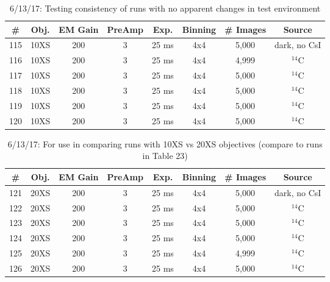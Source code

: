\documentclass[12pt]{amsart}
\begin{document}
\begin{table}[!htbp]
	\centering
	\caption{6/13/17: Testing consistency of runs with no apparent changes in test environment}
	\label{tab:table22}
	\hspace*{-1cm}
	\begin{tabular}{cccccccc}
	\toprule
	\# & Obj. & EM Gain & PreAmp & Exp. & Binning & \# Images & Source\\
	\midrule
	115 & 10XS & 200 & 3 & 25 ms & 4x4 & 5,000 & dark, no CsI\\
	116 & 10XS & 200 & 3 & 25 ms & 4x4 & 4,999 & $^{14}$C\\
	117 & 10XS & 200 & 3 & 25 ms & 4x4 & 5,000 & $^{14}$C\\
	118 & 10XS & 200 & 3 & 25 ms & 4x4 & 5,000 & $^{14}$C\\
	119 & 10XS & 200 & 3 & 25 ms & 4x4 & 5,000 & $^{14}$C\\
	120 & 10XS & 200 & 3 & 25 ms & 4x4 & 5,000 & $^{14}$C\\
	\bottomrule
	\end{tabular}
	\hspace*{-1cm}
\end{table}

\begin{table}[!htbp]
	\centering
	\caption{6/13/17: For use in comparing runs with 10XS vs 20XS objectives
		(compare to runs in Table 23)}
	\label{tab:table23}
	\hspace*{-1cm}
	\begin{tabular}{cccccccc}
	\toprule
	\# & Obj. & EM Gain & PreAmp & Exp. & Binning & \# Images & Source\\
	\midrule
	121 & 20XS & 200 & 3 & 25 ms & 4x4 & 5,000 & dark, no CsI\\
	122 & 20XS & 200 & 3 & 25 ms & 4x4 & 5,000 & $^{14}$C\\
	123 & 20XS & 200 & 3 & 25 ms & 4x4 & 5,000 & $^{14}$C\\
	124 & 20XS & 200 & 3 & 25 ms & 4x4 & 5,000 & $^{14}$C\\
	125 & 20XS & 200 & 3 & 25 ms & 4x4 & 4,999 & $^{14}$C\\
	126 & 20XS & 200 & 3 & 25 ms & 4x4 & 5,000 & $^{14}$C\\
	\bottomrule
	\end{tabular}
	\hspace*{-1cm}
\end{table}
\end{document}
